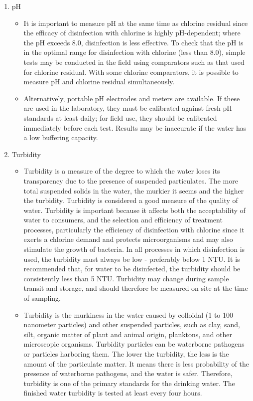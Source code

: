 \begin{enumerate}
\item pH
\begin{itemize}
\item It is important to measure pH at the same time as chlorine residual since the efficacy of disinfection with chlorine is highly pH-dependent; where the pH exceeds 8.0, disinfection is less effective. To check that the pH is in the optimal range for disinfection with chlorine (less than 8.0), simple tests may be conducted in the field using comparators such as that used for chlorine residual. With some chlorine comparators, it is possible to measure pH and chlorine residual simultaneously.

\item Alternatively, portable pH electrodes and meters are available. If these are used in the laboratory, they must be calibrated against fresh pH standards at least daily; for field use, they should be calibrated immediately before each test. Results may be inaccurate if the water has a low buffering capacity.
\end{itemize}



\item Turbidity
\begin{itemize}
\item Turbidity is a measure of the degree to which the water loses its transparency due to the presence of suspended particulates. The more total suspended solids in the water, the murkier it seems and the higher the turbidity. Turbidity is considered a good measure of the quality of water. Turbidity is important because it affects both the acceptability of water to consumers, and the selection and efficiency of treatment processes, particularly the efficiency of disinfection with chlorine since it exerts a chlorine demand and protects microorganisms and may also stimulate the growth of bacteria. In all processes in which disinfection is used, the turbidity must always be low - preferably below 1 NTU. It is recommended that, for water to be disinfected, the turbidity should be consistently less than 5 NTU. Turbidity may change during sample transit and storage, and should therefore be measured on site at the time of sampling.

\item Turbidity is the murkiness in the water caused by colloidal (1 to 100 nanometer particles) and other suspended particles, such as clay, sand, silt, organic matter of plant and animal origin, planktons, and other microscopic organisms. Turbidity particles can be waterborne pathogens or particles harboring them. The lower the turbidity, the less is the amount of the particulate matter. It means there is less probability of the presence of waterborne pathogens, and the water is safer. Therefore, turbidity is one of the primary standards for the drinking water. The finished water turbidity is tested at least every four hours.


\end{itemize}
\end{enumerate}
